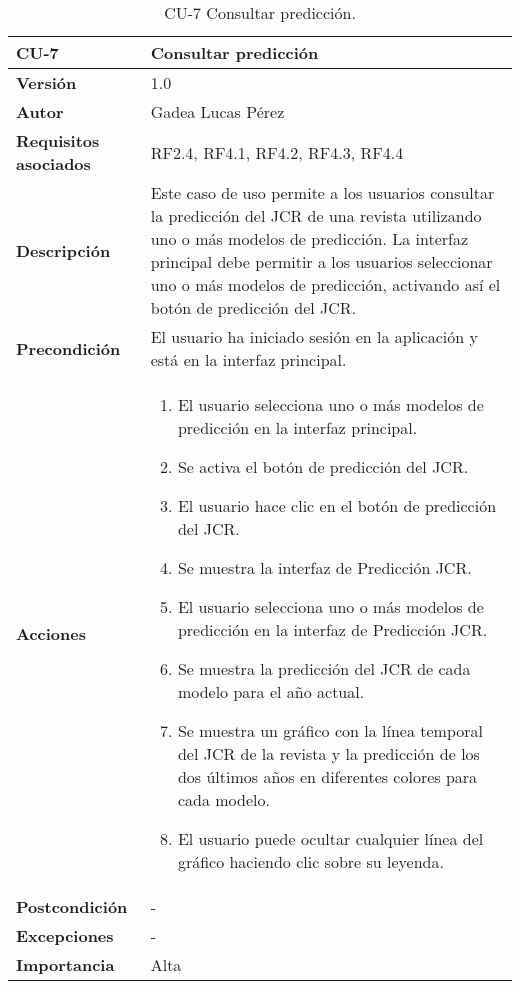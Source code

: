 \begin{table}[p]
\centering
\begin{tabularx}{\linewidth}{ p{} p{} }
\toprule
\textbf{CU-7} & \textbf{Consultar predicción}\\
\toprule
\textbf{Versión} & 1.0 \\
\textbf{Autor} & Gadea Lucas Pérez \\
\textbf{Requisitos asociados} & RF2.4, RF4.1, RF4.2, RF4.3, RF4.4 \\
\textbf{Descripción} & Este caso de uso permite a los usuarios consultar la predicción del JCR de una revista utilizando uno o más modelos de predicción. La interfaz principal debe permitir a los usuarios seleccionar uno o más modelos de predicción, activando así el botón de predicción del JCR.\\
\textbf{Precondición} & El usuario ha iniciado sesión en la aplicación y está en la interfaz principal.\\
\textbf{Acciones} &
\begin{enumerate}
\def\labelenumi{\arabic{enumi}.}
\tightlist
\item El usuario selecciona uno o más modelos de predicción en la interfaz principal.
\item Se activa el botón de predicción del JCR.
\item El usuario hace clic en el botón de predicción del JCR.
\item Se muestra la interfaz de Predicción JCR.
\item El usuario selecciona uno o más modelos de predicción en la interfaz de Predicción JCR.
\item Se muestra la predicción del JCR de cada modelo para el año actual.
\item Se muestra un gráfico con la línea temporal del JCR de la revista y la predicción de los dos últimos años en diferentes colores para cada modelo.
\item El usuario puede ocultar cualquier línea del gráfico haciendo clic sobre su leyenda.
\end{enumerate}\\
\textbf{Postcondición} & - \\
\textbf{Excepciones} & - \\
\textbf{Importancia} & Alta\\
\bottomrule
\end{tabularx}
\caption{CU-7 Consultar predicción.}
\label{tab:cu7}
\end{table}


